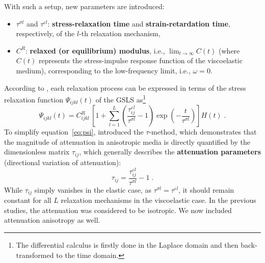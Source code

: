 With such a setup, new parameters are introduced:
\begin{itemize}
    \item $\tau^{\sigma l}$ and $\tau^{\varepsilon l}$: \textbf{stress-relaxation time} and \textbf{strain-retardation time}, respectively, of the $l$-th relaxation mechanism,
    \item $C^R$: \textbf{relaxed (or equilibrium) modulus}, i.e., $\lim_{t\to\infty} C(t)$ (where $C(t)$ represents the stress-impulse response function of the viscoelastic medium), corresponding to the low-frequency limit, i.e., $\omega = 0$.
\end{itemize}
According to \citet{Bai:16}, each relaxation process can be expressed in terms of the stress relaxation function $\Psi_{ijkl}(t)$ of the GSLS as\footnote{The differential calculus is firstly done in the Laplace domain and then back-transformed to the time domain.}
\begin{equation}
    \Psi_{ijkl}(t) = C_{ijkl}^R\,\left[1+\sum_{l=1}^{L} \left(\frac{\tau_{ij}^{\varepsilon l}}{\tau^{\sigma l}}-1\right) \exp\left(-\frac{t}{\tau^{\sigma l}}\right) \right] H(t)\;.
    \label{eq:psi}
\end{equation}
To simplify equation~\ref{eq:psi}, \citet{blanch:95} introduced the $\tau$-method, which demonstrates that the magnitude of attenuation in anisotropic media is directly quantified by the dimensionless matrix $\tau_{ij}$, which generally describes the \textbf{attenuation parameters} (directional variation of attenuation):
\begin{equation}
    \tau_{ij} = \frac{\tau_{ij}^{\varepsilon l}}{\tau^{\sigma l}}-1\;.
    \label{eq:taumethod}
\end{equation}
While $\tau_{ij}$ simply vanishes in the elastic case, as $\tau^{\sigma l} = \tau^{\varepsilon l}$, it should remain constant for all $L$ relaxation mechanisms in the viscoelastic case. In the previous studies, the attenuation was considered to be isotropic. We now included attenuation anisotropy as well.%

